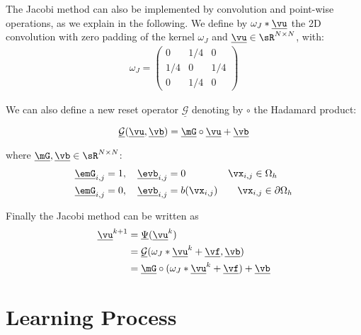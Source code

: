 \documentclass{article} %
\begin{document}
The Jacobi method can also be implemented by convolution and point-wise operations, as we explain in the following. We define by $\omega_J \ast \underline{\vu}$ the 2D convolution with zero padding of the kernel $\omega_J$ and $\underline{\vu} \in \sR^{N\times N}$, with:
\begin{align*}
\omega_{J} = \left (
 \begin{smallmatrix}
0 & 1/4 & 0 \\
1/4 & 0 & 1/4 \\
0 & 1/4 & 0
\end{smallmatrix}
\right )
\end{align*}

We can also define a new reset operator $\underline{\mathcal{G}}$ denoting by $\circ$ the Hadamard product:

\begin{equation*}
    \underline{\mathcal{G}}(\underline{\vu}, \underline{\vb}) = \underline{\mG} \circ \underline{\vu} + \underline{\vb}
\end{equation*}

where $\underline{\mG},\underline{\vb} \in \sR^{N\times N}$:
\begin{align*}
    \underline{\emG}_{i,j} &= 1, \quad \underline{\evb}_{i,j} = 0 \quad \; \quad  \qquad \vx_{i,j}\in \Omega_h \\
    \underline{\emG}_{i,j} &= 0, \quad \underline{\evb}_{i,j} = b(\vx_{i,j})  \qquad \vx_{i,j}\in \partial\Omega_h
\end{align*}

Finally the Jacobi method can be written as 
\begin{align*}
\underline{\vu}^{k+1} &= \underline{\Psi}(\underline{\vu}^k)\\
                      &=\underline{\mathcal{G}}(\omega_J \ast \underline{\vu}^k + \underline{\vf}, \underline{\vb})\\
                      &= \underline{\mG}\circ(\omega_J \ast \underline{\vu}^k + \underline{\vf}) + \underline{\vb}
\end{align*}

\section{Learning Process}
\end{document}
